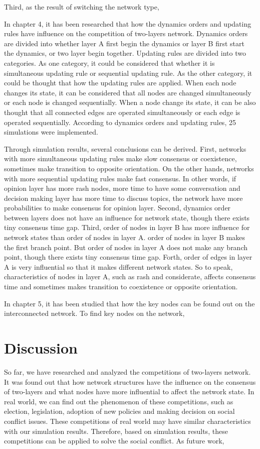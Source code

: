 Third, as the result of switching the network type,  




In chapter 4, it has been researched that how the dynamics orders and updating rules have influence on the competition of two-layers network. Dynamics orders are divided into whether layer A first begin the dynamics or layer B first start the dynamics, or two layer begin together. Updating rules are divided into two categories. As one category, it could be considered that whether it is simultaneous updating rule or sequential updating rule. As the other category, it could be thought that how the updating rules are applied. When each node changes its state, it can be considered that all nodes are changed simultaneously or each node is changed sequentially. When a node change its state, it can be also thought that all connected edges are operated simultaneously or each edge is operated sequentially. 
According to dynamics orders and updating rules, 25 simulations were implemented.   

Through simulation results, several conclusions can be derived. First, networks with more simultaneous updating rules make slow consensus or coexistence, sometimes make transition to opposite orientation. On the other hands, networks with more sequential updating rules make fast consensus. In other words, if opinion layer has more rash nodes, more time to have some conversation and decision making layer has more time to  discuss topics, the network have more probabilities to make consensus for opinion layer. Second, dynamics order between layers does not have an influence for network state, though there exists tiny consensus time gap. Third, order of nodes in layer B has more influence for network states than order of nodes in layer A. order of nodes in layer B makes the first branch point. But order of nodes in layer A does not make any branch point, though there exists tiny consensus time gap. Forth, order of edges in layer A is very influential so that it makes different network states. So to speak, characteristics of nodes in layer A, such as rash and considerate, affects consensus time and sometimes makes transition to coexistence or opposite orientation. 



In chapter 5, it has been studied that how the key nodes can be found out on the interconnected network. To find key nodes on the network, 

\section{Discussion} 
So far, we have researched and analyzed the competitions of two-layers network. It was found out that how network structures have the influence on the consensus of two-layers and what nodes have more influential to affect the network state. In real world, we can find out the phenomenon of these competitions, such as election, legislation, adoption of new policies and making decision on social conflict issues. These competitions of real world may have similar characteristics with our simulation results. Therefore, based on simulation results, these competitions can be applied to solve the social conflict.  As future work, 

